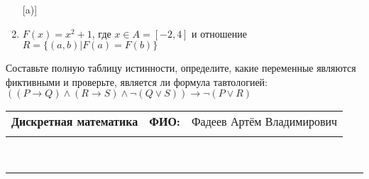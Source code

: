 \documentclass[10pt]{exam}
\newcommand{\class}{Дискретная математика}
\newcommand{\examdate}{}
\begin{document}
\begin{questions}
\begin{enumerate} [a)]
\item $F(x)=x^{2}+1$, где $x \in A = [-2, 4]$ и отношение $R = \{(a,b)|F(a) = F(b)\}$
\end{enumerate}\question Составьте полную таблицу истинности, определите, какие переменные являются фиктивными и проверьте, является ли формула тавтологией:
$((P \rightarrow Q) \land (R \rightarrow S) \land \neg (Q \lor S)) \rightarrow \neg (P \lor R)$

\end{questions}
\newpage
\begin{flushright}
\begin{tabular}{p{2.8in} r l}
\textbf{\class} & \textbf{ФИО:} &Фадеев Артём Владимирович
\\

\textbf{\examdate} &&\\
\end{tabular}\\
\end{flushright}
\rule[1ex]{\textwidth}{.1pt}
\end{document}
